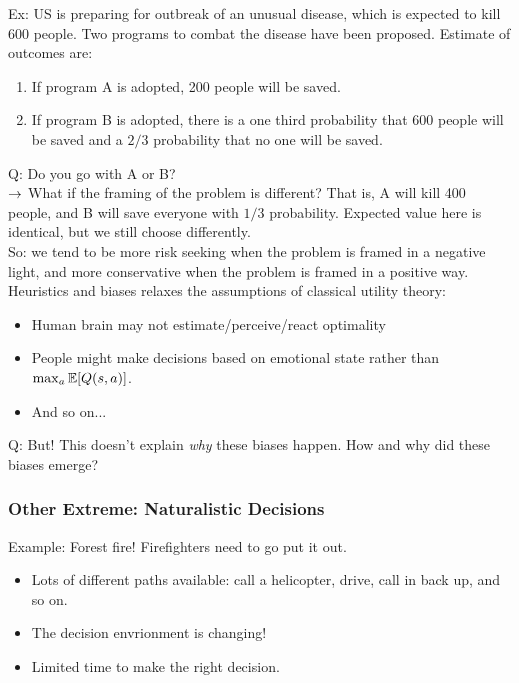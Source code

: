 Ex: US is preparing for outbreak of an unusual disease, which is expected to kill 600 people. Two programs to combat the disease have been proposed. Estimate of outcomes are:
\begin{enumerate}[A]
    \item If program A is adopted, 200 people will be saved.
    \item If program B is adopted, there is a one third probability that 600 people will be saved and a $2/3$ probability that no one will be saved.
\end{enumerate}
Q: Do you go with A or B? \\

$\rightarrow$ What if the framing of the problem is different? That is, A will kill 400 people, and B will save everyone with $1/3$ probability. Expected value here is identical, but we still choose differently. \\

So: we tend to be more risk seeking when the problem is framed in a negative light, and more conservative when the problem is framed in a positive way. \\

Heuristics and biases relaxes the assumptions of classical utility theory:
\begin{itemize}
    \item Human brain may not estimate/perceive/react optimality
    \item People might make decisions based on emotional state rather than $\max_a \mathbb{E}[Q(s,a)]$.
    \item And so on...
\end{itemize}

Q: But! This doesn't explain {\it why} these biases happen. How and why did these biases emerge? \\

\subsubsection{Other Extreme: Naturalistic Decisions~\cite{salas2001linking}}

Example: Forest fire! Firefighters need to go put it out.
\begin{itemize}
    \item Lots of different paths available: call a helicopter, drive, call in back up, and so on.
    \item The decision envrionment is changing!
    \item Limited time to make the right decision.
\end{itemize}


